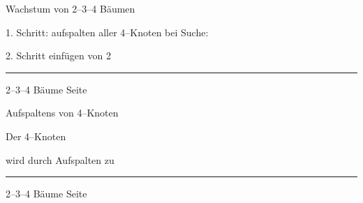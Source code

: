 
\begin{slide}{}
\normalsize

\begin{center}
Wachstum  von 2--3--4 B\"aumen
\end{center}
\vspace*{0.5cm}

\footnotesize
\hspace*{2.3cm}  

1. Schritt: aufspalten aller 4--Knoten bei Suche:

\hspace*{2.3cm} 

2. Schritt einf\"ugen von 2

\hspace*{2.3cm} 


\vspace*{\fill}
\tiny \addtocounter{mypage}{1}
\rule{17cm}{1mm}
2--3--4 B\"aume  \hspace*{\fill} Seite 
\end{slide}


\begin{slide}{}
\normalsize

\begin{center}
Aufspaltens von 4--Knoten
\end{center}
\vspace*{0.5cm}

\footnotesize

Der 4--Knoten

\hspace*{1.3cm} 

wird durch Aufspalten zu

\hspace*{1.3cm} 


\vspace*{\fill}
\tiny \addtocounter{mypage}{1}
\rule{17cm}{1mm}
2--3--4 B\"aume  \hspace*{\fill} Seite 
\end{slide}


